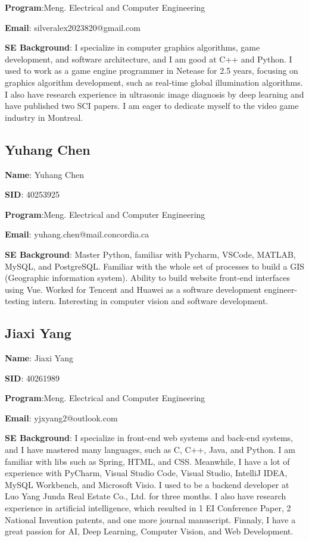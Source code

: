 \documentclass[conference]{IEEEtran}
\begin{document}
\textbf{Program}:Meng. Electrical and Computer Engineering

\textbf{Email}: silveralex2023820@gmail.com

\textbf{SE Background}: I specialize in computer graphics algorithms, game development, and software architecture, and I am good at C++ and Python. I used to work as a game engine programmer in Netease for 2.5 years, focusing on graphics algorithm development, such as real-time global illumination algorithms. I also have research experience in ultrasonic image diagnosis by deep learning and have published two SCI papers. I am eager to dedicate myself to the video game industry in Montreal.



\subsection{Yuhang Chen}


\textbf{Name}: Yuhang Chen

\textbf{SID}: 40253925

\textbf{Program}:Meng. Electrical and Computer Engineering

\textbf{Email}: yuhang.chen@mail.concordia.ca

\textbf{SE Background}: Master Python, familiar with Pycharm, VSCode, MATLAB, MySQL, and PostgreSQL. Familiar with the whole set of processes to build a GIS (Geographic information system). Ability to build website front-end interfaces using Vue. Worked for Tencent and Huawei as a software development engineer-testing intern. Interesting in computer vision and software development.


\subsection{Jiaxi Yang}


\textbf{Name}:  Jiaxi Yang

\textbf{SID}:  40261989

\textbf{Program}:Meng. Electrical and Computer Engineering

\textbf{Email}: yjxyang2@outlook.com

\textbf{SE Background}: I specialize in front-end web systems and back-end systems, and I have mastered many languages, such as C, C++, Java, and Python. I am familiar with libs such as Spring, HTML, and CSS. Meanwhile, I have a lot of experience with PyCharm, Visual Studio Code, Visual Studio, IntelliJ IDEA, MySQL Workbench, and Microsoft Visio. I used to be a backend developer at Luo Yang Junda Real Estate Co., Ltd. for three months. I also have research experience in artificial intelligence, which resulted in 1 EI Conference Paper, 2 National Invention patents, and one more journal manuscript. Finnaly, I have a great passion for AI, Deep Learning, Computer Vision, and Web Development.
\end{document}
